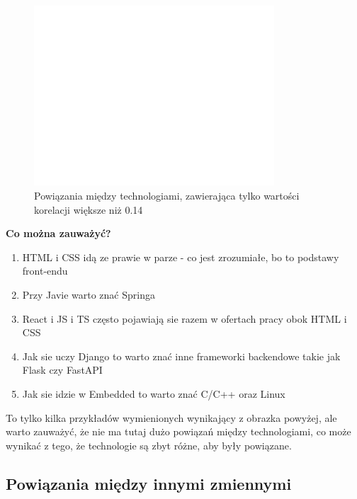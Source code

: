 \documentclass{article}
\begin{document}
\begin{figure}[H]
    \centering
    \includegraphics[width=0.8\textwidth]{../analysis/plots/korelacje/Korelacja między technologiami.png}
    \caption{Powiązania między technologiami, zawierająca tylko wartości korelacji większe niż 0.14}
\end{figure}

\quad \textbf{Co można zauważyć?}

\begin{enumerate}
    \item HTML i CSS idą ze prawie w parze - co jest zrozumiałe, bo to podstawy front-endu
    \item Przy Javie warto znać Springa
    \item React i JS i TS często pojawiają sie razem w ofertach pracy obok HTML i CSS
    \item Jak sie uczy Django to warto znać inne frameworki backendowe takie jak Flask czy FastAPI
    \item Jak sie idzie w Embedded to warto znać C/C++ oraz Linux
\end{enumerate}

\quad To tylko kilka przykładów wymienionych wynikający z obrazka powyżej, ale warto zauważyć, że nie ma tutaj dużo
powiązań między technologiami, co może wynikać z tego, że technologie są zbyt różne, aby były powiązane.


\subsection{Powiązania między innymi zmiennymi}
\end{document}
